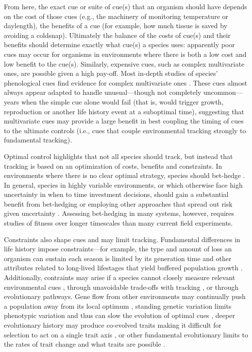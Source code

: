 \documentclass[11pt,letterpaper]{article}
\begin{document}
From here, the exact cue or suite of cue(s) that an organism should have depends on the cost of those cues (e.g., the machinery of monitoring temperature or daylength), the benefits of a cue (for example, how much tissue is saved by avoiding a coldsnap). Ultimately the balance of the costs of cue(s) and their benefits should determine exactly what cue(s) a species uses: apparently poor cues may occur for organisms in environments where there is both a low cost and low benefit to the cue(s). Similarly, expensive cues, such as complex multivariate ones, are possible given a high pay-off. Most in-depth studies of species' phenological cues find evidence for complex multivariate ones \citep{chuinearees}. These cues almost always appear adapted to handle unusual---though not completely uncommon---years when the simple cue alone would fail (that is, would trigger growth, reproduction or another life history event at a suboptimal time), suggesting that multivariate cues may provide a large benefit in best coupling the timing of cues to the ultimate controls (i.e., cues that couple environmental tracking strongly to fundamental tracking). 

Optimal control highlights that not all species should track, but instead that tracking is based on an optimization of costs, benefits and constraints. In environments where there is no clear optimal strategy, species should bet-hedge \citep{decasas2015}. In general, species in highly variable environments, or which otherwise face high uncertainty in when to time investment decisions, should gain a substantial benefit from bet-hedging or employing other approaches that spread out risk given uncertainty \citep{Venable:2007os,donald2013}. Assessing bet-hedging in many systems, however, requires studies of fitness over longer timescales than many current field experiments. %

Constraints also shape cues and may limit tracking. Fundamental differences in life history impose constraints---for example, the type and amount of loss an organism can sustain each season is limited by its generation time and other attributes related to long-lived lifestages that yield buffered population growth \citep{Chesson:1997dz}. Additionally, contraints may arise if a species cannot closely measure relevant environmental cues \citep{arnold1992,Singer:2010eb}, through unavoidable trade-offs with tracking \citep{Singer:2010eb,Johansson2012}, or through evolutionary pathways. Gene flow from other environments may continually push a population away from its local optimum \citep{lenormand2002}, standing genetic variation limits phenotypic variation and thus can slow the evolution of optimal cues \citep{Franks:2007wd,ghalambor2015}, deeper evolutionary history may produce co-evolved traits making it difficult for selection to act on a single trait axis \citep{Ackerly:2009ly}, or other fundamental evolutionary limits to the rates of trait change and what traits are possible \citep{spandrels}. 
\end{document}
